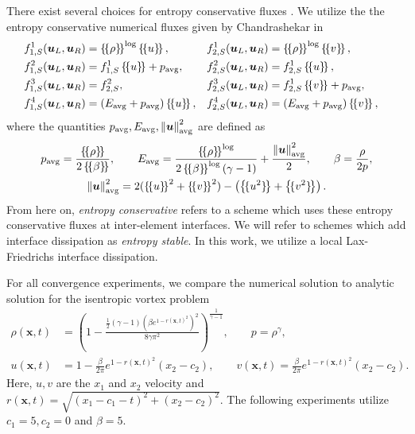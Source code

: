 \documentclass{svjour3}                     %
\newcommand{\nor}[1]{\left\| #1 \right\|}
\newcommand{\LRp}[1]{\left( #1 \right)}
\newcommand{\LRc}[1]{\left\{ #1 \right\}}
\newcommand{\avg}[1] {\ensuremath{\LRc{\!\{#1\}\!}}}
\begin{document}
There exist several choices for entropy conservative fluxes \cite{ismail2009affordable, ranocha2018comparison,chandrashekar2013kinetic}.  We utilize the
the entropy conservative numerical fluxes given by Chandrashekar in \cite{chandrashekar2013kinetic}
\begin{align*}
&f^1_{1,S}(\bm{u}_L,\bm{u}_R) = \avg{\rho}^{\log} \avg{u},& &f^1_{2,S}(\bm{u}_L,\bm{u}_R) = \avg{\rho}^{\log} \avg{v},&\\
&f^2_{1,S}(\bm{u}_L,\bm{u}_R) = f^1_{1,S} \avg{u} + p_{\rm avg},&  &f^2_{2,S}(\bm{u}_L,\bm{u}_R) = f^1_{2,S} \avg{u},&\nonumber\\
&f^3_{1,S}(\bm{u}_L,\bm{u}_R) = f^2_{2,S},& &f^3_{2,S}(\bm{u}_L,\bm{u}_R) = f^1_{2,S} \avg{v} + p_{\rm avg},&\nonumber\\
&f^4_{1,S}(\bm{u}_L,\bm{u}_R) = \LRp{E_{\rm avg} + p_{\rm avg}}\avg{u},& &f^4_{2,S}(\bm{u}_L,\bm{u}_R) = \LRp{E_{\rm avg} + p_{\rm avg} }\avg{v},& \nonumber
\end{align*}
where the quantities $p_{\rm avg}, E_{\rm avg},  \nor{\bm{u}}^2_{\rm avg}$ are defined as
\begin{gather*}
p_{\rm avg} = \frac{\avg{\rho}}{2\avg{\beta}}, \qquad E_{\rm avg} = \frac{\avg{\rho}^{\log}}{2\avg{\beta}^{\log}\LRp{\gamma -1}}   + \frac{\nor{\bm{u}}^2_{\rm avg}}{2}, \qquad  \beta = \frac{\rho}{2p},\\
 \nor{\bm{u}}^2_{\rm avg} = 2(\avg{u}^2 + \avg{v}^2) - \LRp{\avg{u^2} +\avg{v^2}} \nonumber.
\end{gather*}
From here on, \emph{entropy conservative} refers to a scheme which uses these entropy conservative fluxes at inter-element interfaces.  We will refer to schemes which add interface dissipation as \emph{entropy stable}.  In this work, we utilize a local Lax-Friedrichs interface dissipation.  

For all convergence experiments, we compare the numerical solution to analytic solution for the isentropic vortex problem \cite{shu1998essentially} 
\begin{align*}
\rho(\bm{x},t) &= \LRp{1 - \frac{\frac{1}{2}(\gamma-1)(\beta e^{1-r(\bm{x},t)^2})^2}{8\gamma \pi^2}}^{\frac{1}{\gamma-1}}, \qquad p = \rho^{\gamma},\\
u(\bm{x},t) &= 1 - \frac{\beta}{2\pi} e^{1-r(\bm{x},t)^2}(x_2-c_2), \qquad v(\bm{x},t) = \frac{\beta}{2\pi} e^{1-r(\bm{x},t)^2}(x_2-c_2).\nonumber
\end{align*}
Here, $u, v$ are the $x_1$ and $x_2$ velocity and $r(\bm{x},t) = \sqrt{(x_1-c_1-t)^2 + (x_2-c_2)^2}$.  The following experiments utilize $c_1 = 5, c_2 = 0$ and $\beta = 5$.  
\end{document}
